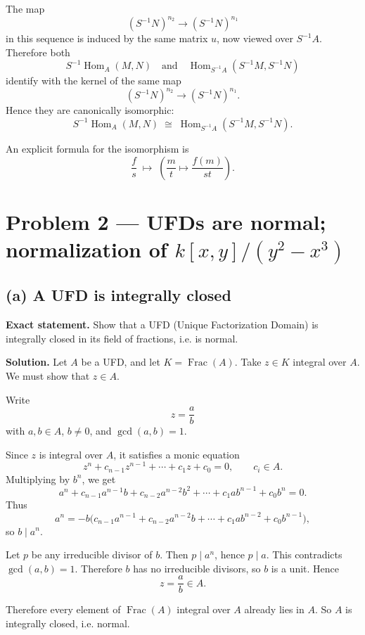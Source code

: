 \documentclass[12pt,a4paper]{article}
\theoremstyle{plain}
\theoremstyle{definition}      %
\begin{document}
The map
\[
(S^{-1}N)^{n_2}\to (S^{-1}N)^{n_1}
\]
in this sequence is induced by the same matrix \(u\), now viewed over \(S^{-1}A\). Therefore both
\[
S^{-1}\operatorname{Hom}_A(M,N)
\quad\text{and}\quad
\operatorname{Hom}_{S^{-1}A}(S^{-1}M,S^{-1}N)
\]
identify with the kernel of the same map
\[
(S^{-1}N)^{n_2}\to (S^{-1}N)^{n_1}.
\]
Hence they are canonically isomorphic:
\[
S^{-1}\!\operatorname{Hom}_A(M,N)\;\cong\;\operatorname{Hom}_{S^{-1}A}(S^{-1}M,S^{-1}N).
\]

An explicit formula for the isomorphism is
\[
\frac{f}{s}\;\longmapsto\;\left(\frac{m}{t}\mapsto \frac{f(m)}{st}\right).
\]

\bigskip

\section*{Problem 2 --- UFDs are normal; normalization of \texorpdfstring{$k[x,y]/(y^2-x^3)$}{k[x,y]/(y\string^2-x\string^3)}}

\subsection*{(a) A UFD is integrally closed}

\textbf{Exact statement.}
Show that a UFD (Unique Factorization Domain) is integrally closed in its field of fractions, i.e. is normal.

\textbf{Solution.}
Let \(A\) be a UFD, and let \(K=\operatorname{Frac}(A)\). Take \(z\in K\) integral over \(A\). We must show that \(z\in A\).

Write
\[
z=\frac{a}{b}
\]
with \(a,b\in A\), \(b\neq 0\), and \(\gcd(a,b)=1\).

Since \(z\) is integral over \(A\), it satisfies a monic equation
\[
z^n+c_{n-1}z^{n-1}+\cdots+c_1z+c_0=0,
\qquad c_i\in A.
\]
Multiplying by \(b^n\), we get
\[
a^n+c_{n-1}a^{n-1}b+c_{n-2}a^{n-2}b^2+\cdots+c_1ab^{n-1}+c_0b^n=0.
\]
Thus
\[
a^n=-b\big(c_{n-1}a^{n-1}+c_{n-2}a^{n-2}b+\cdots+c_1ab^{n-2}+c_0b^{n-1}\big),
\]
so \(b\mid a^n\).

Let \(p\) be any irreducible divisor of \(b\). Then \(p\mid a^n\), hence \(p\mid a\). This contradicts \(\gcd(a,b)=1\). Therefore \(b\) has no irreducible divisors, so \(b\) is a unit. Hence
\[
z=\frac{a}{b}\in A.
\]

Therefore every element of \(\operatorname{Frac}(A)\) integral over \(A\) already lies in \(A\). So \(A\) is integrally closed, i.e. normal.
\end{document}
